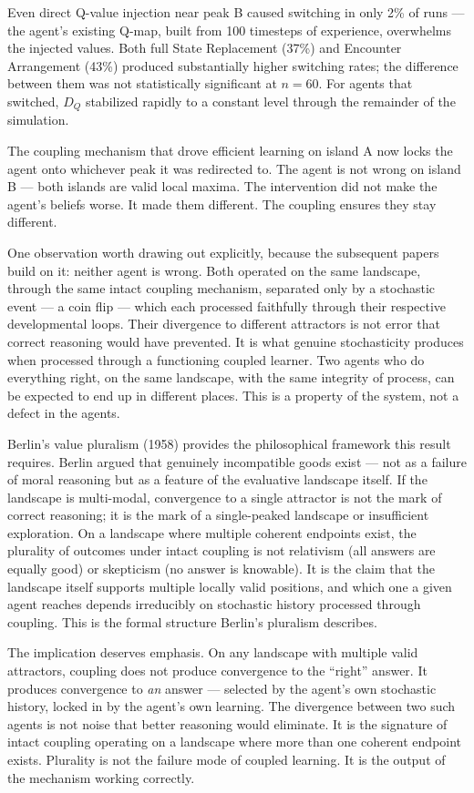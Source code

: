 \documentclass[
]{article}
\begin{document}
Even direct Q-value injection near peak B caused switching in only 2\%
of runs --- the agent's existing Q-map, built from 100 timesteps of
experience, overwhelms the injected values. Both full State Replacement
(37\%) and Encounter Arrangement (43\%) produced substantially higher
switching rates; the difference between them was not statistically
significant at \(n = 60\). For agents that switched, \(D_Q\) stabilized
rapidly to a constant level through the remainder of the simulation.

The coupling mechanism that drove efficient learning on island A now
locks the agent onto whichever peak it was redirected to. The agent is
not wrong on island B --- both islands are valid local maxima. The
intervention did not make the agent's beliefs worse. It made them
different. The coupling ensures they stay different.

One observation worth drawing out explicitly, because the subsequent
papers build on it: neither agent is wrong. Both operated on the same
landscape, through the same intact coupling mechanism, separated only by
a stochastic event --- a coin flip --- which each processed faithfully
through their respective developmental loops. Their divergence to
different attractors is not error that correct reasoning would have
prevented. It is what genuine stochasticity produces when processed
through a functioning coupled learner. Two agents who do everything
right, on the same landscape, with the same integrity of process, can be
expected to end up in different places. This is a property of the
system, not a defect in the agents.

Berlin's value pluralism (1958) provides the philosophical framework
this result requires. Berlin argued that genuinely incompatible goods
exist --- not as a failure of moral reasoning but as a feature of the
evaluative landscape itself. If the landscape is multi-modal,
convergence to a single attractor is not the mark of correct reasoning;
it is the mark of a single-peaked landscape or insufficient exploration.
On a landscape where multiple coherent endpoints exist, the plurality of
outcomes under intact coupling is not relativism (all answers are
equally good) or skepticism (no answer is knowable). It is the claim
that the landscape itself supports multiple locally valid positions, and
which one a given agent reaches depends irreducibly on stochastic
history processed through coupling. This is the formal structure
Berlin's pluralism describes.

The implication deserves emphasis. On any landscape with multiple valid
attractors, coupling does not produce convergence to the ``right''
answer. It produces convergence to \emph{an} answer --- selected by the
agent's own stochastic history, locked in by the agent's own learning.
The divergence between two such agents is not noise that better
reasoning would eliminate. It is the signature of intact coupling
operating on a landscape where more than one coherent endpoint exists.
Plurality is not the failure mode of coupled learning. It is the output
of the mechanism working correctly.
\end{document}
